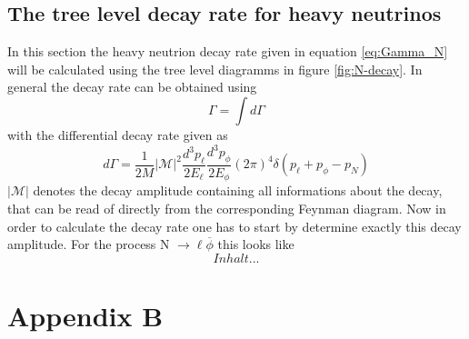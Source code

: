 \section{The tree level decay rate for heavy neutrinos}
\label{ap:tree_level_decay}
In this section the heavy neutrion decay rate given in equation \ref{eq:Gamma_N} will be calculated using the tree level diagramms in figure \ref{fig:N-decay}. \newline
In general the decay rate can be obtained using
\begin{equation*}
\Gamma=\int d\Gamma
\end{equation*}
with the differential decay rate given as
\begin{equation*}
d\Gamma=\frac{1}{2M}\left|\mathcal{M}\right|^2\frac{d^3p_\ell}{2E_\ell}\frac{d^3p_\phi}{2E_\phi}(2\pi)^4\delta\left(p_\ell+p_\phi-p_N\right)
\end{equation*}
$\left|\mathcal{M}\right|$ denotes the decay amplitude containing all informations about the decay, that can be read of directly from the corresponding Feynman diagram. 
Now in order to calculate the decay rate one has to start by determine exactly this decay amplitude. For the process N $\rightarrow\ell\overline{\phi}$ this looks like
\begin{equation*}
Inhalt...
\end{equation*}
\chapter{Appendix B}
